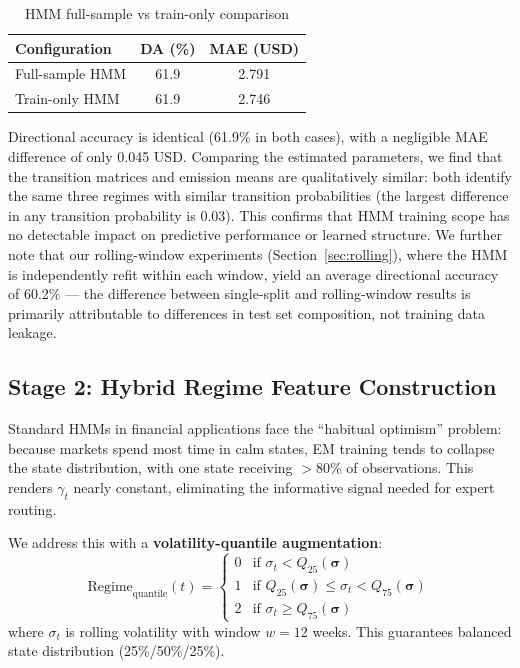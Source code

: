 \documentclass[3p,times]{elsarticle}
\begin{document}
\begin{table}[htbp]
\centering
\caption{HMM full-sample vs train-only comparison}
\begin{tabular}{lcc}
\midrule
Configuration & DA (\%) & MAE (USD) \\
\midrule
Full-sample HMM & 61.9 & 2.791 \\
Train-only HMM & 61.9 & 2.746 \\
\bottomrule
\end{tabular}
\end{table}

Directional accuracy is identical (61.9\% in both cases), with a negligible MAE difference of only 0.045 USD. Comparing the estimated parameters, we find that the transition matrices and emission means are qualitatively similar: both identify the same three regimes with similar transition probabilities (the largest difference in any transition probability is 0.03). This confirms that HMM training scope has no detectable impact on predictive performance or learned structure. We further note that our rolling-window experiments (Section~\ref{sec:rolling}), where the HMM is independently refit within each window, yield an average directional accuracy of 60.2\% — the difference between single-split and rolling-window results is primarily attributable to differences in test set composition, not training data leakage.

\subsection{Stage 2: Hybrid Regime Feature Construction}
\label{sec:method:features}

Standard HMMs in financial applications face the ``habitual optimism'' problem: because markets spend most time in calm states, EM training tends to collapse the state distribution, with one state receiving $>$80\% of observations. This renders $\gamma_t$ nearly constant, eliminating the informative signal needed for expert routing.

We address this with a \textbf{volatility-quantile augmentation}:
\begin{equation}
\text{Regime}_{\text{quantile}}(t) = \begin{cases} 0 & \text{if } \sigma_t < Q_{25}(\boldsymbol{\sigma}) \\ 1 & \text{if } Q_{25}(\boldsymbol{\sigma}) \leq \sigma_t < Q_{75}(\boldsymbol{\sigma}) \\ 2 & \text{if } \sigma_t \geq Q_{75}(\boldsymbol{\sigma}) \end{cases}
\end{equation}
where $\sigma_t$ is rolling volatility with window $w=12$ weeks. This guarantees balanced state distribution (25\%/50\%/25\%).
\end{document}
